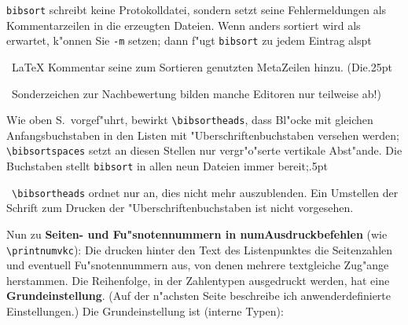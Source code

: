 \documentclass[12pt,a4paper]{article}
\newcommand{\pdfko}[1]{\kern #1pt
                          \strut\ignorespaces}%
\begin{document}
\vspace{1ex}\noindent
\verb|bibsort| schreibt keine Protokolldatei, sondern setzt seine
Fehlermeldungen als Kommentarzeilen in die erzeugten Dateien. 
Wenn anders sortiert wird als erwartet, k"onnen Sie \ko\verb|-m| 
setzen; dann f"ugt \verb|bibsort| zu jedem Eintrag als\pdfko{1.25}\   
\LaTeX\hy 
Kommentar seine zum Sortieren genutzten Meta\hy Zeilen hinzu.
(Die\pdfko{.25}\    
Sonderzeichen zur Nachbewertung bilden manche Editoren 
nur teilweise ab!)

\vspace{1ex}\noindent
Wie oben S.\,\pageref{head} vorgef"uhrt, bewirkt \verb|\bibsortheads|,
dass Bl"ocke mit gleichen Anfangsbuchstaben in den Listen mit 
"Uberschriftenbuchstaben versehen werden; \verb|\bibsortspaces|
setzt an diesen Stellen nur vergr"o"serte vertikale Abst"ande.
Die Buchstaben stellt \verb|bibsort| in allen neun
Dateien immer bereit;\pdfko{.5}\ 
\verb|\bibsortheads| ordnet nur an, dies nicht mehr auszublenden. 
Ein Umstellen der Schrift zum Drucken der "Uberschriftenbuchstaben 
ist nicht vorgesehen.


\vspace{1.5ex}\noindent
Nun zu \textbf{Seiten- und Fu"snotennummern in num\hy Ausdruckbefehlen} (wie \verb|\printnumvkc|):
Die drucken hinter den Text des Listenpunktes die Seitenzahlen und eventuell Fu"snotennummern aus,
von denen mehrere textgleiche Zug"ange herstammen. Die Reihenfolge,
in der Zahlentypen ausgedruckt werden, hat eine \textbf{Grundeinstellung}.
(Auf der n"achsten Seite beschreibe ich anwenderdefinierte Einstellungen.)
Die Grundeinstellung ist (interne Typen):
\end{document}
